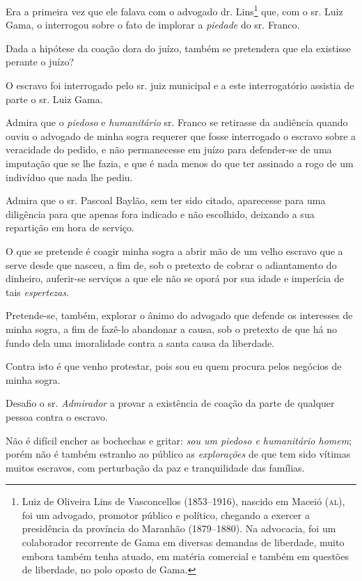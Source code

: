 {\begin{flushright}
Era a primeira vez que ele falava com o advogado dr. Lins\footnote{
  Luiz de Oliveira Lins de Vasconcellos (1853--1916), nascido em Maceió
  (\textsc{al}), foi um advogado, promotor público e político, chegando a exercer
  a presidência da província do Maranhão (1879--1880). Na advocacia, foi
  um colaborador recorrente de Gama em diversas demandas de liberdade,
  muito embora também tenha atuado, em matéria comercial e também em
  questões de liberdade, no polo oposto de Gama.} que, com o sr. Luiz
Gama, o interrogou sobre o fato de implorar a \emph{piedade} do sr.
Franco.

Dada a hipótese da coação dora do juízo, também se pretendera que ela
existisse perante o juízo?

O escravo foi interrogado pelo sr. juiz municipal e a este
interrogatório assistia de parte o sr. Luiz Gama.

Admira que o \emph{piedoso} e \emph{humanitário} sr. Franco se retirasse
da audiência quando ouviu o advogado de minha sogra requerer que fosse
interrogado o escravo sobre a veracidade do pedido, e não permanecesse
em juízo para defender-se de uma imputação que se lhe fazia, e que é
nada menos do que ter assinado a rogo de um indivíduo que nada lhe
pediu.

Admira que o sr. Pascoal Baylão, sem ter sido citado, aparecesse para
uma diligência para que apenas fora indicado e não escolhido, deixando a
sua repartição em hora de serviço.

O que se pretende é coagir minha sogra a abrir mão de um velho escravo
que a serve desde que nasceu, a fim de, sob o pretexto de cobrar o
adiantamento do dinheiro, auferir-se serviços a que ele não se oporá por
sua idade e imperícia de tais \emph{espertezas}.

Pretende-se, também, explorar o ânimo do advogado que defende os
interesses de minha sogra, a fim de fazê-lo abandonar a causa, sob o
pretexto de que há no fundo dela uma imoralidade contra a santa causa da
liberdade.

Contra isto é que venho protestar, pois sou eu quem procura pelos
negócios de minha sogra.

Desafio o sr. \emph{Admirador} a provar a existência de coação da parte
de qualquer pessoa contra o escravo.

Não é difícil encher as bochechas e gritar: \emph{sou um piedoso e
humanitário homem}; porém não é também estranho ao público as
\emph{explorações} de que tem sido vítimas muitos escravos, com
perturbação da paz e tranquilidade das famílias.


\end{flushright}}
